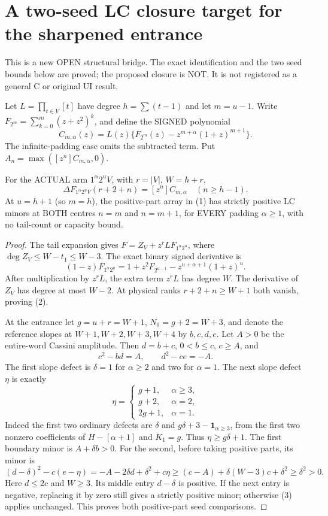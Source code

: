 \section{A two-seed LC closure target for the sharpened entrance}
This is a new OPEN structural bridge. The exact identification and
the two seed bounds below are proved; the proposed closure is NOT.
It is not registered as a general C or original UI result.

Let $L=\prod_{t\in V}[t]$ have degree $h=\sum(t-1)$ and let
$m=u-1$. Write $F_{2^m}=\sum_{k=0}^m(z+z^2)^k$, and define the
SIGNED polynomial
\[
 C_{m,\alpha}(z)=L(z)\{F_{2^m}(z)
                   -z^{m+\alpha}(1+z)^{m+1}\}.         \tag{1}
\]
The infinite-padding case omits the subtracted term. Put
$A_n=\max([z^n]C_{m,\alpha},0)$.

\begin{proposition}
For the ACTUAL arm $1^\alpha2^uV$, with $r=|V|$, $W=h+r$,
\[
            \Delta F_{1^\alpha2^uV}(r+2+n)
                           =[z^n]C_{m,\alpha}\quad(n\ge h-1). \tag{2}
\]
At $u=h+1$ (so $m=h$), the positive-part array in (1) has strictly
positive LC minors at BOTH centres $n=m$ and $n=m+1$, for EVERY
padding $\alpha\ge1$, with no tail-count or capacity bound.
\end{proposition}
\begin{proof}
The tail expansion gives $F=Z_V+z^r L F_{1^\alpha2^u}$, where
$\deg Z_V\le W-t_1\le W-3$. The exact binary signed derivative is
\[
 (1-z)F_{1^\alpha2^u}=1+z^2F_{2^{u-1}}
                         -z^{u+\alpha+1}(1+z)^u.
\]
After multiplication by $z^rL$, the extra term $z^rL$ has degree
$W$. The derivative of $Z_V$ has degree at most $W-2$.
At physical ranks $r+2+n\ge W+1$ both vanish, proving (2).

At the entrance let $g=u+r=W+1$, $N_0=g+2=W+3$, and denote
the reference slopes at $W+1,W+2,W+3,W+4$ by $b,c,d,e$.
Let $A>0$ be the entire-word Cassini amplitude.
Then $d=b+c$, $0<b\le c$, $c\ge A$, and
\[
                  c^2-bd=A,\qquad d^2-ce=-A.
\]
The first slope defect is $\delta=1$ for $\alpha\ge2$ and two for
$\alpha=1$. The next slope defect $\eta$ is exactly
\[
 \eta=\begin{cases}g+1,&\alpha\ge3,\\g+2,&\alpha=2,\\2g+1,&\alpha=1.
 \end{cases}
\]
Indeed the first two ordinary defects are $\delta$ and
$g\delta+3-\mathbf1_{\alpha\ge3}$, from the first two nonzero
coefficients of $H-[\alpha+1]$ and $K_1=g$.
Thus $\eta\ge g\delta+1$.
The first boundary minor is $A+\delta b>0$.
For the second, before taking positive parts, its minor is
\[
 (d-\delta)^2-c(e-\eta)
       =-A-2\delta d+\delta^2+c\eta
       \ge(c-A)+\delta(W-3)c+\delta^2\ge\delta^2>0.       \tag{3}
\]
Here $d\le2c$ and $W\ge3$. Its middle entry $d-\delta$ is positive.
If the next entry is negative, replacing it by zero still gives
a strictly positive minor; otherwise (3) applies unchanged.
This proves both positive-part seed comparisons.
\end{proof}

